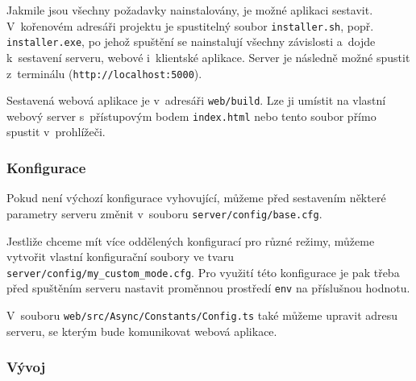 \documentclass[a4paper,12pt]{article}
\def\code#1{\texttt{#1}}
\begin{document}
{{{{{{{{{{Jakmile jsou všechny požadavky nainstalovány, je možné aplikaci sestavit. V~kořenovém adresáři projektu je spustitelný soubor \code{installer.sh}, popř. \code{installer.exe}, po jehož spuštění se nainstalují všechny závislosti a~dojde k~sestavení serveru, webové i~klientské aplikace. Server je následně možné spustit z~terminálu (\code{http://localhost:5000}).



\vspace{-5pt}

Sestavená webová aplikace je v~adresáři \code{web/build}. Lze ji umístit na  vlastní webový server s~přístupovým bodem \code{index.html} nebo tento soubor přímo spustit v~prohlížeči.

\vspace{-5pt}

\subsubsection{Konfigurace}

Pokud není výchozí konfigurace vyhovující, můžeme před sestavením některé parametry serveru změnit v~souboru \code{server/config/base.cfg}.



\vspace{-10pt}

Jestliže chceme mít více oddělených konfigurací pro různé režimy, můžeme vytvořit vlastní konfigurační soubory ve tvaru \code{server/config/my\_custom\_mode.cfg}. Pro využití této konfigurace je pak třeba před spuštěním serveru nastavit proměnnou prostředí \code{env} na příslušnou hodnotu.



V~souboru \code{web/src/Async/Constants/Config.ts} také můžeme upravit adresu serveru, se kterým bude komunikovat webová aplikace.



\vspace{-25pt}

\subsubsection{Vývoj}

}}}}}}}}}}
\end{document}
